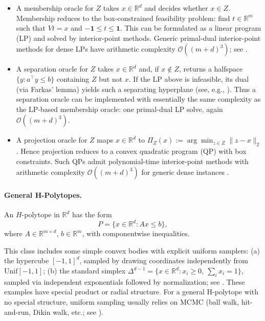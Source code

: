 \documentclass[11pt,letterpaper]{article}
\begin{document}
\begin{itemize}
  \item    A membership oracle for $Z$ takes $x\in\mathbb{R}^d$ and decides whether $x\in Z$.
  Membership reduces to the box-constrained feasibility problem: find $t\in\mathbb{R}^m$ such that $Vt = x$ and $-\mathbf{1}\le t\le \mathbf{1}$. This can be formulated as a linear program (LP) and solved by interior-point methods.
  Generic primal-dual interior-point methods for dense LPs have arithmetic complexity $\mathcal{O}((m+d)^3)$; see \cite{Nesterovnemir1994}.

  \item A separation oracle for $Z$ takes $x\in\mathbb{R}^d$ and, if $x\notin Z$, returns a halfspace $\{y:a^\top y\le b\}$ containing $Z$ but not $x$.
  If the LP above is infeasible, its dual (via Farkas' lemma) yields such a separating hyperplane (see, e.g., \cite[Exercise~5.23]{Boyd2004}).
  Thus a separation oracle can be implemented with essentially the same complexity as the LP-based membership oracle: one primal-dual LP solve, again $\mathcal{O}((m+d)^3)$.

  \item A projection oracle for $Z$ maps $x\in\mathbb{R}^d$ to $\Pi_Z(x) := \arg\min_{z\in Z}\|z-x\|_2$.
  Hence projection reduces to a convex quadratic program (QP) with box constraints.
  Such QPs admit polynomial-time interior-point methods with arithmetic complexity $\mathcal{O}((m+d)^3)$ for generic dense instances \cite{Nesterovnemir1994}.
\end{itemize}

\paragraph*{General H-Polytopes.}

An $H$-polytope in $\mathbb{R}^d$ has the form
\[
  P  =  \{x\in\mathbb{R}^d : Ax \le b\},
\]
where $A\in\mathbb{R}^{m\times d}$, $b\in\mathbb{R}^m$, with componentwise inequalities.

This class includes some simple convex bodies with explicit uniform samplers: (a) the hypercube $[-1,1]^d$, sampled by drawing coordinates independently from $\mathrm{Unif}[-1,1]$; (b) the standard simplex $\Delta^{d-1} = \{x\in\mathbb{R}^d : x_i\ge 0,\ \sum_i x_i = 1\}$, sampled via independent exponentials followed by normalization; see \cite[Chapter 9]{Devroye1986}. 
These examples have special product or radial structure. For a general H-polytope with no special structure, uniform sampling usually relies on MCMC (ball walk, hit-and-run, Dikin walk, etc.; see \cite{dyer1991random,lovasz2006fast}).
\end{document}
